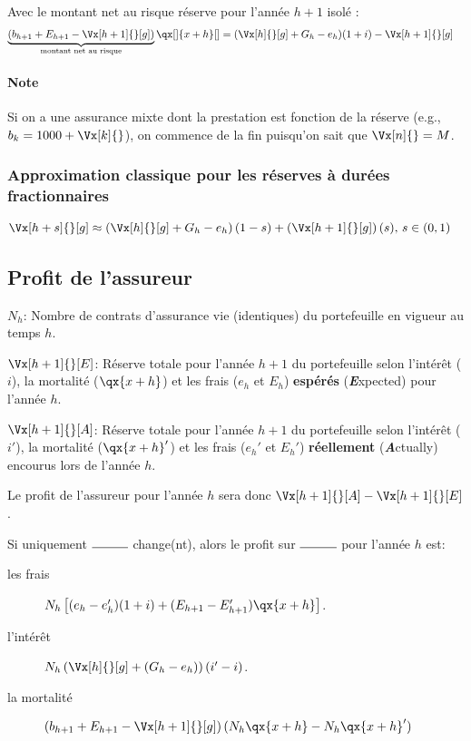 \documentclass[10pt, french]{article}
\begin{document}
\begin{multicols*}{2}
Avec le montant net au risque réserve pour l'année $h + 1$ isolé :
\begin{align*}
	\underbrace{(b_{h + 1} + E_{h + 1} - \Vx[h + 1]{}[g])}_{\text{montant net au risque}} \qx[]{x+h}[]
	&= 	(\Vx[h]{}[g] + G_h - e_h)(1 + i) - \Vx[h + 1]{}[g]
\end{align*}

\paragraph*{Note}	Si on a une assurance mixte dont la prestation est fonction de la réserve (e.g., $b_{k} = 1000 + \Vx[k]{}$), on commence de la fin puisqu'on sait que $\Vx[n]{} = M$.

\subsubsection*{Approximation classique pour les réserves à durées fractionnaires}
\begin{align*}
	\Vx[h + s]{}[g]
	&\approx	\left(\Vx[h]{}[g] + G_h - e_h\right)(1 - s) + \left(\Vx[h + 1]{}[g]\right)(s), \, s \in (0, 1)
\end{align*}

\subsection{Profit de l'assureur}
\begin{distributions}[Notation]
\begin{description}
	\item[]	$N_{h}$: Nombre de contrats d'assurance vie (identiques) du portefeuille en vigueur au temps $h$.
	\item[]	$\Vx[h + 1]{}[E]$: Réserve totale pour l'année $h + 1$ du portefeuille selon l'intérêt ($i$), la mortalité ($\qx{x + h}$) et les frais ($e_{h}$ et $E_{h}$) \textbf{espérés} (\textit{\textbf{E}}xpected) pour l'année $h$.
	\item[]	$\Vx[h + 1]{}[A]$: Réserve totale pour l'année $h + 1$ du portefeuille selon l'intérêt ($i'$), la mortalité ($\qx{x + h}'$) et les frais ($e_{h}'$ et $E_{h}'$) \textbf{réellement} (\textit{\textbf{A}}ctually) encourus lors de l'année $h$.
	\item	Le profit de l'assureur pour l'année $h$ sera donc $\Vx[h + 1]{}[A] - \Vx[h + 1]{}[E]$.
\end{description}
\end{distributions}

Si uniquement $\rule{1cm}{0.15mm}$ change(nt), alors le profit sur $\rule{1cm}{0.15mm}$ pour l'année $h$ est:
\begin{description}
	\item[les frais]	$N_{h}\left[ (e_{h} - e_{h}')(1 + i) + (E_{h + 1} - E_{h + 1}')\qx{x + h} \right]$.
	\item[l'intérêt]	$N_{h} \left( \Vx[h]{}[g] + (G_{h} - e_{h}) \right) (i' - i)$.
	\item[la mortalité]	$\left( b_{h + 1} + E_{h + 1} - \Vx[h + 1]{}[g] \right)(N_{h}\qx{x + h} - N_{h}\qx{x + h}')$
\end{description}


\end{multicols*}
\end{document}
